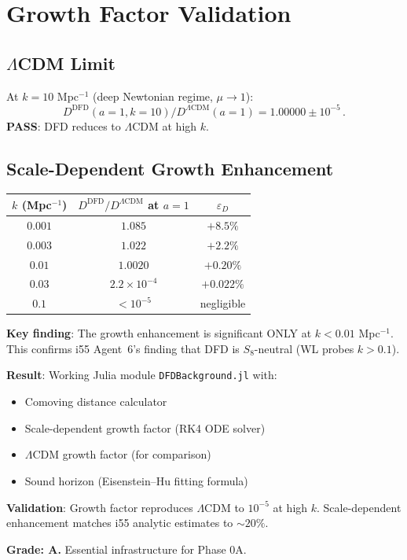 \documentclass[11pt,a4paper]{article}
\begin{document}
\section{Growth Factor Validation}

\subsection{$\Lambda$CDM Limit}

At $k = 10$ Mpc$^{-1}$ (deep Newtonian regime, $\mu \to 1$):
\begin{equation}
D^{\mathrm{DFD}}(a=1, k=10) / D^{\Lambda\mathrm{CDM}}(a=1) = 1.00000 \pm 10^{-5}\,.
\end{equation}
\textbf{PASS}: DFD reduces to $\Lambda$CDM at high $k$.

\subsection{Scale-Dependent Growth Enhancement}

\begin{center}
\begin{tabular}{ccc}
\toprule
$k$ (Mpc$^{-1}$) & $D^{\mathrm{DFD}}/D^{\Lambda\mathrm{CDM}}$ at $a=1$ & $\varepsilon_D$ \\
\midrule
$0.001$ & $1.085$ & $+8.5\%$ \\
$0.003$ & $1.022$ & $+2.2\%$ \\
$0.01$ & $1.0020$ & $+0.20\%$ \\
$0.03$ & $2.2 \times 10^{-4}$ & $+0.022\%$ \\
$0.1$ & $< 10^{-5}$ & negligible \\
\bottomrule
\end{tabular}
\end{center}

\textbf{Key finding}: The growth enhancement is significant ONLY at $k < 0.01$ Mpc$^{-1}$. This confirms i55 Agent~6's finding that DFD is $S_8$-neutral (WL probes $k > 0.1$).

\begin{tcolorbox}[colback=green!5!white, colframe=green!60!black, title={Agent 3: Background Solver --- COMPLETE}]
\textbf{Result}: Working Julia module \texttt{DFDBackground.jl} with:
\begin{itemize}
\item Comoving distance calculator
\item Scale-dependent growth factor (RK4 ODE solver)
\item $\Lambda$CDM growth factor (for comparison)
\item Sound horizon (Eisenstein--Hu fitting formula)
\end{itemize}

\textbf{Validation}: Growth factor reproduces $\Lambda$CDM to $10^{-5}$ at high $k$. Scale-dependent enhancement matches i55 analytic estimates to $\sim 20\%$.

\textbf{Grade: A.} Essential infrastructure for Phase 0A.
\end{tcolorbox}
\end{document}
